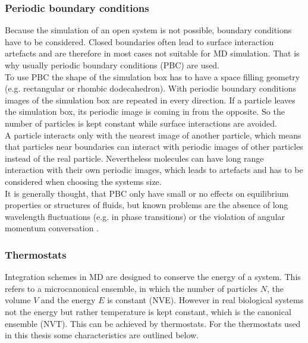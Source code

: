 \subsubsection{Periodic boundary conditions}
\label{subsec:pbc}
Because the simulation of an open system is not possible, boundary conditions have to be considered. Closed boundaries often lead to surface interaction artefacts and are therefore in most cases not suitable for MD simulation. That is why usually periodic boundary conditions (PBC) are used.\\
To use PBC the shape of the simulation box has to have a space filling geometry (e.g. rectangular or rhombic dodecahedron). With periodic boundary conditions images of the simulation box are repeated in every direction. If a particle leaves the simulation box, its periodic image is coming in from the opposite. So the number of particles is kept constant while surface interactions are avoided.\\
A particle interacts only with the nearest image of another particle, which means that particles near boundaries can interact with periodic images of other particles instead of the real particle. Nevertheless molecules can have long range interaction with their own periodic images, which leads to artefacts and has to be considered when choosing the systems size.\\
It is generally thought, that PBC only have small or no effects on equilibrium properties or structures of fluids, but known problems are the absence of long wavelength fluctuations (e.g. in phase transitions) or the violation of angular momentum conversation \autocite[p. 141f]{greenBook}.
\subsubsection{Thermostats}
Integration schemes in MD are designed to conserve the energy of a system. This refers to a microcanonical ensemble, in which the number of particles $N$, the volume $V$ and the energy $E$ is constant (NVE). However in real biological systems not the energy but rather temperature is kept constant, which is the canonical ensemble (NVT). This can be achieved by thermostats. For the thermostats used in this thesis some characteristics are outlined below.
